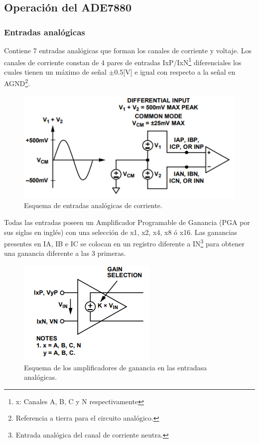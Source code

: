 \documentclass[letterpaper,12pt,oneside]{book}
\begin{document}
			\subsection{Operación del ADE7880}
				\subsubsection{Entradas analógicas}
				Contiene 7 entradas analógicas que forman los canales de corriente y voltaje. Los canales de corriente constan de 4 pares de entradas IxP/IxN\footnote{x: Canales A, B, C y N respectivamente} diferenciales los cuales tienen un máximo de señal $\pm$0.5[V] e igual con respecto a la señal en AGND\footnote{Referencia a tierra para el circuito analógico.}.

				\begin{figure}[!htpb]
					\centering
					\includegraphics[scale = 1.0]{Material de Consulta/EntAnCrrnt.PNG}
					\caption[Entradas analógicas de corriente]{Esquema de entradas analógicas de corriente.}
					\label{EntCrnt}
				\end{figure}

				Todas las entradas poseen un Amplificador Programable de Ganancia (PGA por sus siglas en inglés) con una selección de x1, x2, x4, x8 ó x16. Las ganancias presentes en IA, IB e IC se colocan en un registro diferente a IN\footnote{Entrada analógica del canal de corriente neutra.} para obtener una ganancia diferente a las 3 primeras.

				\begin{figure}[!htpb]
					\centering
					\includegraphics[scale = 1.0]{Material de Consulta/AmpGan.PNG}
					\caption[Amplificadores de Ganancia]{Esquema de los amplificadores de ganancia en las entradasa analógicas.}
					\label{AmpGan}
				\end{figure}
\end{document}

